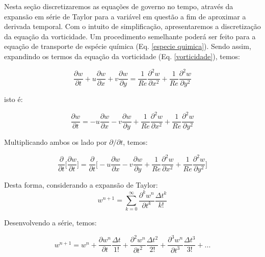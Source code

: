 Nesta seção discretizaremos as equações de governo no tempo,
através da expansão em série de Taylor para a variável em questão 
a fim de aproximar a derivada temporal. Com o intuito de simplificação,
apresentaremos a discretização da equação da vorticidade.
Um procedimento semelhante poderá ser feito para a equação de transporte de espécie química (Eq. \ref{especie quimica}).
Sendo assim, expandindo os termos da equação da vorticidade (Eq. \ref{vorticidade}), temos:

\begin{equation}
 \frac{\partial w}{\partial t} 
 + u\frac{\partial w}{\partial x}
 + v\frac{\partial w}{\partial y} 
 = \frac{1}{Re} \frac{\partial^{2} w}{\partial x^{2}}
 + \frac{1}{Re} \frac{\partial^{2} w}{\partial y^{2}}
\end{equation}

\medskip
\noindent
isto é:

\begin{equation} \label{vorticity expanded}
 \frac{\partial w}{\partial t} 
 = - u\frac{\partial w}{\partial x}
 - v\frac{\partial w}{\partial y} 
 + \frac{1}{Re} \frac{\partial^{2} w}{\partial x^{2}}
 + \frac{1}{Re} \frac{\partial^{2} w}{\partial y^{2}}
\end{equation}

\noindent
Multiplicando ambos os lado por $\partial /\partial t$, temos:

\begin{equation} \label{vorticity expanded with dt}
 \frac{\partial }{\partial t}
 \Bigg[ 
 \frac{\partial w}{\partial t} 
 \Bigg]
 = 
 \frac{\partial }{\partial t}
 \Bigg[ 
 - u \frac{\partial w}{\partial x}
 - v \frac{\partial w}{\partial y}
 + \frac{1}{Re} \frac{\partial^2 w}{\partial x^2} 
 + \frac{1}{Re} \frac{\partial^2 w}{\partial y^2} 
 \Bigg]
\end{equation}


\noindent
Desta forma, considerando a expansão de Taylor:
\begin{equation}
 w^{n+1} = \sum\limits_{k=0}^{\infty} 
           \frac{\partial^k w^{n}}{\partial t^k} \frac{\Delta t^k}{k!}
\end{equation}

\medskip
\noindent
Desenvolvendo a série, temos:

\begin{equation}
 w^{n+1} = w^{n} 
         + \frac{\partial w^{n}}{\partial t} \frac{\Delta t}{1!} 
         + \frac{\partial^2 w^{n}}{\partial t^2} \frac{\Delta t^2}{2!}
         + \frac{\partial^3 w^{n}}{\partial t^3} \frac{\Delta t^3}{3!}
         + ...
\end{equation}

